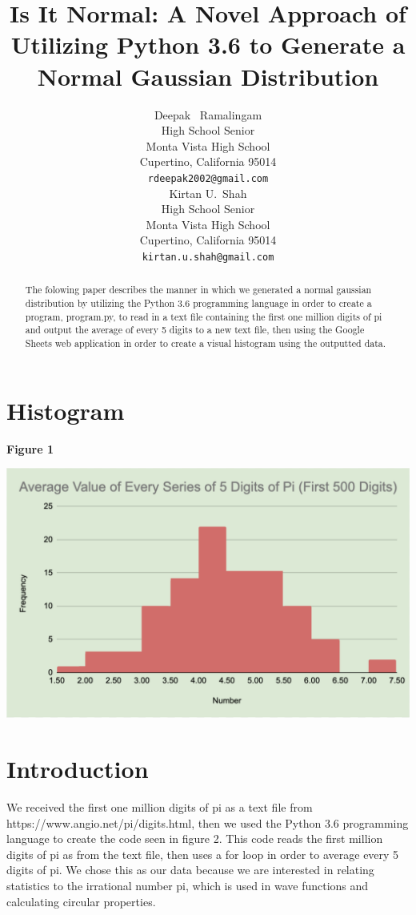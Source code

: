 \documentclass{article}
\title{Is It Normal: A Novel Approach of Utilizing Python 3.6 to Generate a Normal Gaussian Distribution}
\author{
  Deepak ~Ramalingam \\
  High School Senior \\
  Monta Vista High School\\
  Cupertino, California 95014 \\
  \texttt{rdeepak2002@gmail.com} \\
   \And
 Kirtan U.~Shah \\
  High School Senior\\
  Monta Vista High School\\
  Cupertino, California 95014 \\
  \texttt{kirtan.u.shah@gmail.com} \\
}
\begin{document}
\maketitle

\begin{abstract}
The folowing paper describes the manner in which we generated a normal gaussian distribution by utilizing the Python 3.6 programming language in order to create a program, program.py, to read in a text file containing the first one million digits of pi and output the average of every 5 digits to a new text file, then using the Google Sheets web application in order to create a visual histogram using the outputted data.
\end{abstract}

\section{Histogram}

\centerline{\textbf{Figure 1}}

\includegraphics[width=\textwidth]{histogram.png}

\section{Introduction}
We received the first one million digits of pi as a text file from https://www.angio.net/pi/digits.html, then we used the Python 3.6 programming language to create the code seen in figure 2. This code reads the first million digits of pi as from the text file, then uses a for loop in order to average every 5 digits of pi. We chose this as our data because we are interested in relating statistics to the irrational number pi, which is used in wave functions and calculating circular properties. 
\end{document}
